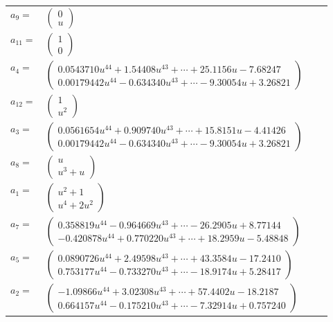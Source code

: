 \documentclass[1p]{elsarticle_modified}
\theoremstyle{definition}
\begin{document}
\begin{tabular}{m{7pt} m{180pt} m{7pt} m{180pt} }
\flushright $a_{9}=$&$\begin{pmatrix}0\\u\end{pmatrix}$ \\
\flushright $a_{11}=$&$\begin{pmatrix}1\\0\end{pmatrix}$ \\
\flushright $a_{4}=$&$\begin{pmatrix}0.0543710 u^{44}+1.54408 u^{43}+\cdots+25.1156 u-7.68247\\0.00179442 u^{44}-0.634340 u^{43}+\cdots-9.30054 u+3.26821\end{pmatrix}$ \\
\flushright $a_{12}=$&$\begin{pmatrix}1\\u^2\end{pmatrix}$ \\
\flushright $a_{3}=$&$\begin{pmatrix}0.0561654 u^{44}+0.909740 u^{43}+\cdots+15.8151 u-4.41426\\0.00179442 u^{44}-0.634340 u^{43}+\cdots-9.30054 u+3.26821\end{pmatrix}$ \\
\flushright $a_{8}=$&$\begin{pmatrix}u\\u^3+u\end{pmatrix}$ \\
\flushright $a_{1}=$&$\begin{pmatrix}u^2+1\\u^4+2 u^2\end{pmatrix}$ \\
\flushright $a_{7}=$&$\begin{pmatrix}0.358819 u^{44}-0.964669 u^{43}+\cdots-26.2905 u+8.77144\\-0.420878 u^{44}+0.770220 u^{43}+\cdots+18.2959 u-5.48848\end{pmatrix}$ \\
\flushright $a_{5}=$&$\begin{pmatrix}0.0890726 u^{44}+2.49598 u^{43}+\cdots+43.3584 u-17.2410\\0.753177 u^{44}-0.733270 u^{43}+\cdots-18.9174 u+5.28417\end{pmatrix}$ \\
\flushright $a_{2}=$&$\begin{pmatrix}-1.09866 u^{44}+3.02308 u^{43}+\cdots+57.4402 u-18.2187\\0.664157 u^{44}-0.175210 u^{43}+\cdots-7.32914 u+0.757240\end{pmatrix}$ \\

\end{tabular}
\end{document}
